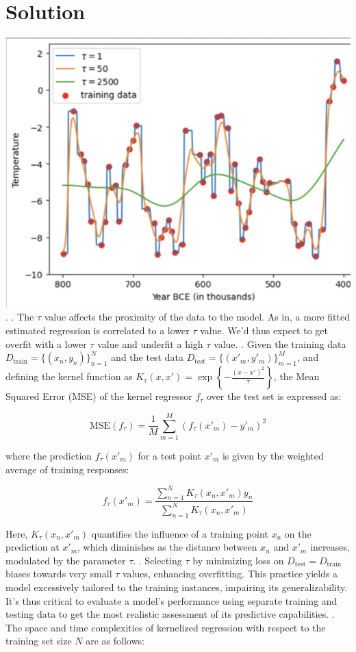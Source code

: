 \documentclass[submit]{harvardml}
\newenvironment{solution}
  {\color{blue}\section*{Solution}}
{}
\begin{document}
\begin{solution}
 \includegraphics[width=0.5\linewidth]{hw1/ss1.png}.
. The $\tau$ value affects the proximity of the data to the model. As in, a more fitted estimated regression is correlated to a lower $\tau$ value. We'd thus expect to get overfit with a lower $\tau$ value and underfit a high $\tau$ value. 
. Given the training data \(D_{\text{train}} = \{(x_n, y_n)\}_{n=1}^N\) and the test data \(D_{\text{test}} = \{(x'_m, y'_m)\}_{m=1}^M\), and defining the kernel function as \(K_\tau(x, x') = \exp\left\{-\frac{(x - x')^2}{\tau}\right\}\), the Mean Squared Error (MSE) of the kernel regressor \(f_\tau\) over the test set is expressed as:

\[
\text{MSE}(f_\tau) = \frac{1}{M} \sum_{m=1}^M \left( f_\tau(x'_m) - y'_m \right)^2
\]

where the prediction \(f_\tau(x'_m)\) for a test point \(x'_m\) is given by the weighted average of training responses:

\[
f_\tau(x'_m) = \frac{\sum_{n=1}^N K_\tau(x_n, x'_m) y_n}{\sum_{n=1}^N K_\tau(x_n, x'_m)}
\]

Here, \(K_\tau(x_n, x'_m)\) quantifies the influence of a training point \(x_n\) on the prediction at \(x'_m\), which diminishes as the distance between \(x_n\) and \(x'_m\) increases, modulated by the parameter \(\tau\).
. Selecting \(\tau\) by minimizing loss on \(D_{\text{test}} = D_{\text{train}}\) biases towards very small \(\tau\) values, enhancing overfitting. This practice yields a model excessively tailored to the training instances, impairing its generalizability. It's thus critical to evaluate a model's performance using separate training and testing data to get the most realistic assessment of its predictive capabilities.
. The space and time complexities of kernelized regression with respect to the training set size $N$ are as follows:


\end{solution}
\end{document}
